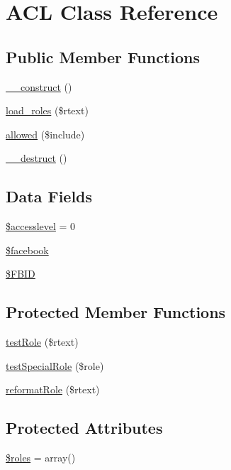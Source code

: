 \hypertarget{classACL}{
\section{ACL Class Reference}
\label{classACL}
}
\subsection*{Public Member Functions}
\begin{DoxyCompactItemize}
\item 
\hyperlink{classACL_a095c5d389db211932136b53f25f39685}{\_\-\_\-construct} ()
\item 
\hyperlink{classACL_a9a4659729420394ae67f53af92014161}{load\_\-roles} (\$rtext)
\item 
\hyperlink{classACL_a6fa1c0fb1fecd2abce07dbebeb92f6db}{allowed} (\$include)
\item 
\hyperlink{classACL_a421831a265621325e1fdd19aace0c758}{\_\-\_\-destruct} ()
\end{DoxyCompactItemize}
\subsection*{Data Fields}
\begin{DoxyCompactItemize}
\item 
\hyperlink{classACL_a0bf784879d9d0f847c5a766c72f4aa6d}{\$accesslevel} = 0
\item 
\hyperlink{classACL_a4b9bb5e9f7a5ea9381bdbe31c44e9339}{\$facebook}
\item 
\hyperlink{classACL_a98c2b7539e7a3869452f63a3237c4c2d}{\$FBID}
\end{DoxyCompactItemize}
\subsection*{Protected Member Functions}
\begin{DoxyCompactItemize}
\item 
\hyperlink{classACL_ac4182b2045a2ae5765552d94781534bd}{testRole} (\$rtext)
\item 
\hyperlink{classACL_a883a4154eb19eae9ac94692a44077d1c}{testSpecialRole} (\$role)
\item 
\hyperlink{classACL_acdd4abb7a9965230bf76bede2a7ea7dd}{reformatRole} (\$rtext)
\end{DoxyCompactItemize}
\subsection*{Protected Attributes}
\begin{DoxyCompactItemize}
\item 
\hyperlink{classACL_a24a565772e407805783bcc46deeafeb3}{\$roles} = array()
\end{DoxyCompactItemize}


